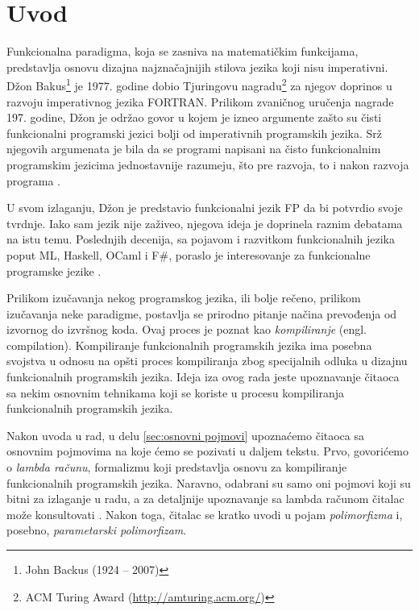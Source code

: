 \section{Uvod}
\label{sec:uvod}

Funkcionalna paradigma, koja se zasniva na matematičkim funkcijama, predstavlja osnovu dizajna najznačajnijih stilova jezika koji nisu imperativni. Džon Bakus\footnote{John Backus (1924 -- 2007)} je 1977. godine dobio Tjuringovu nagradu\footnote{ACM Turing Award (\url{http://amturing.acm.org/})} za njegov doprinos u razvoju imperativnog jezika FORTRAN. Prilikom zvaničnog uručenja nagrade 197. godine, Džon je održao govor u kojem je izneo argumente zašto su čisti funkcionalni programski jezici bolji od imperativnih programskih jezika. Srž njegovih argumenata je bila da se programi napisani na čisto funkcionalnim programskim jezicima jednostavnije razumeju, što pre razvoja, to i nakon razvoja programa \cite{Can-Programming-Be-Liberated-from-the-von-Neumann-Style?, Concepts-of-Programming-Languages}.

U svom izlaganju, Džon je predstavio funkcionalni jezik FP da bi potvrdio svoje tvrdnje. Iako sam jezik nije zaživeo, njegova ideja je doprinela raznim debatama na istu temu. Poslednjih decenija, sa pojavom i razvitkom funkcionalnih jezika poput ML, Haskell, OCaml i F\#, poraslo je interesovanje za funkcionalne programske jezike \cite{Concepts-of-Programming-Languages}.

Prilikom izučavanja nekog programskog jezika, ili bolje rečeno, prilikom izučavanja neke paradigme, postavlja se prirodno pitanje načina prevođenja od izvornog do izvršnog koda. Ovaj proces je poznat kao \textit{kompiliranje} (engl. compilation). Kompiliranje funkcionalnih programskih jezika ima posebna svojstva u odnosu na opšti proces kompiliranja zbog specijalnih odluka u dizajnu funkcionalnih programskih jezika. Ideja iza ovog rada jeste upoznavanje čitaoca sa nekim osnovnim tehnikama koji se koriste u procesu kompiliranja funkcionalnih programskih jezika.

Nakon uvoda u rad, u delu \ref{sec:osnovni pojmovi} upoznaćemo čitaoca sa osnovnim pojmovima na koje ćemo se pozivati u daljem tekstu. Prvo, govorićemo o \textit{lambda računu}, formalizmu koji predstavlja osnovu za kompiliranje funkcionalnih programskih jezika. Naravno, odabrani su samo oni pojmovi koji su bitni za izlaganje u radu, a za detaljnije upoznavanje sa lambda računom čitalac može konsultovati \cite{Introduction-to-Combinators-and-Lambda-Calculus}. Nakon toga, čitalac se kratko uvodi u pojam \textit{polimorfizma} i, posebno, \textit{parametarski polimorfizam}.

